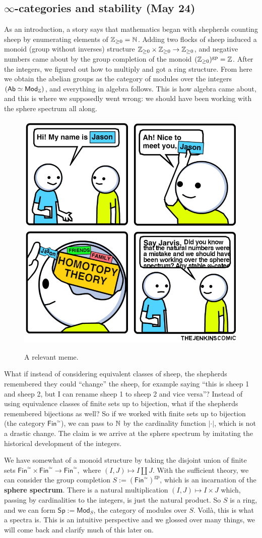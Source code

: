 \subsection{$\infty$-categories and stability (May 24)}
As an introduction, a story says that mathematics began with shepherds counting sheep by enumerating elements of $\mathbb{Z}_{\geq 0}=\mathbb{N}$. Adding two flocks of sheep induced a monoid (group without inverses) structure $\mathbb{Z}_{\geq 0}\times \mathbb{Z}_{\geq 0}\to  \mathbb{Z}_{\geq 0}$, and negative numbers came about by the group completion of the monoid $(\mathbb{Z}_{\geq 0})^{\mathrm{gp}}=\mathbb{Z}$. 
After the integers, we figured out how to multiply and got a ring structure. From here we obtain the abelian groups as the category of modules over the integers $(\mathsf{Ab} \simeq \mathsf{Mod} _{\mathbb{Z}})$, and everything in algebra follows. This is how algebra came about, and this is where we supposedly went wrong: we should have been working with the sphere spectrum all along.
\begin{figure}[H]
\centering
 \includegraphics[width=0.5\linewidth]{figures/jarvis.png}
 \label{jarvis} 
 \caption{A relevant meme.} 
\end{figure}
What if instead of considering equivalent classes of sheep, the shepherds remembered they could ``change'' the sheep, for example saying ``this is sheep 1 and sheep 2, but I can rename sheep 1 to sheep 2 and vice versa''? Instead of using equivalence classes of finite sets up to bijection, what if the shepherds remembered bijections as well? So if we worked with finite sets up to bijection (the category $\mathsf{Fin} ^{\simeq}$), we can pass to $\mathbb{N}$ by the cardinality function $|\cdot |$, which is not a drastic change. The claim is we arrive at the sphere spectrum by imitating the historical development of the integers.

We have somewhat of a monoid structure by taking the disjoint union of finite sets $\mathsf{Fin} ^{\simeq} \times \mathsf{Fin} ^{\simeq}\to \mathsf{Fin} ^{\simeq},$ where $(I,J) \mapsto I \amalg J$. With the sufficient theory, we can consider the group completion $S :=(\mathsf{Fin} ^{\simeq})^{\mathrm{gp}}$, which is an incarnation of the \textbf{sphere spectrum}. There is a natural multiplication $(I,J) \mapsto I \times J$ which, passing by cardinalities to the integers, is just the natural product. So $S$ is a ring, and we can form $\mathsf{Sp} := \mathsf{Mod} _S$, the category of modules over $S$. Voil\`a, this is what a spectra is. This is an intuitive perspective and we glossed over many things, we will come back and clarify much of this later on.


